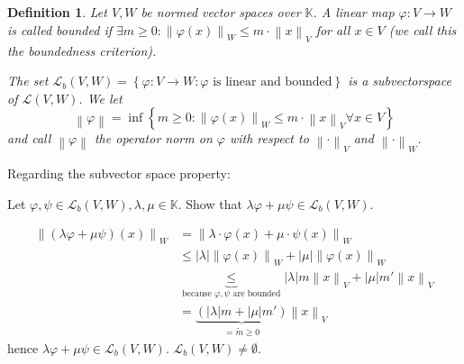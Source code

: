 \documentclass{article}
\newtheorem{definition}{Definition}  \numberwithin{definition}{section}
\newcommand{\set}[1]{\left\{#1\right\}}
\newcommand{\norm}[1]{\left\|#1\right\|}
\newcommand{\card}[1]{\left|#1\right|}
\begin{document}
\begin{definition} %
  \label{opdef}
  Let $V, W$ be normed vector spaces over $\mathbb K$. A linear map $\varphi: V \to W$ is called \emph{bounded} if $\exists m \geq 0: \norm{\varphi(x)}_W \leq m \cdot \norm{x}_V$ for all $x \in V$ (we call this the \emph{boundedness criterion}).

  The set $\mathcal L_b(V, W) = \set{\varphi: V \to W: \varphi \text{ is linear and bounded}}$ is a subvectorspace of $\mathcal L(V, W)$. We let
  \[ \norm{\varphi} = \inf\set{m \geq 0: \norm{\varphi(x)}_W \leq m \cdot \norm{x}_V \forall x \in V} \]
  and call $\norm{\varphi}$ the \emph{operator norm} on $\varphi$ with respect to $\norm{\cdot}_V$ and $\norm{\cdot}_W$.
\end{definition}

Regarding the subvector space property:

Let $\varphi, \psi \in \mathcal L_b(V, W), \lambda, \mu \in \mathbb K$.
Show that $\lambda \varphi + \mu \psi \in \mathcal L_b(V, W)$.

\begin{align*}
  \norm{(\lambda \varphi + \mu \psi)(x)}_W
    &= \norm{\lambda \cdot \varphi(x) + \mu \cdot \psi(x)}_W \\
    &\leq \card{\lambda} \norm{\varphi(x)}_W + \card{\mu} \norm{\varphi(x)}_W \\
    &\underbrace{\leq}_{\text{because } \varphi, \psi \text{ are bounded}} \card{\lambda} m \norm{x}_V + \card{\mu} m' \norm{x}_V \\
    &= \underbrace{\left(\card{\lambda} m + \card{\mu} m'\right)}_{= \tilde m \geq 0} \norm{x}_V
\end{align*}
hence $\lambda \varphi + \mu \psi \in \mathcal L_b(V, W)$.
$\mathcal L_b(V, W) \neq \emptyset$.
\end{document}
